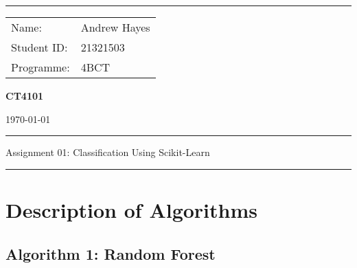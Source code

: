 \documentclass[a4paper]{article}
\begin{document}
\hrule \medskip
\begin{minipage}{0.295\textwidth} 
    \vfill
    \raggedright
    \footnotesize 
    \begin{tabular}{@{}l l} %
        Name: & Andrew Hayes \\
        Student ID: & 21321503 \\
        Programme: & 4BCT \\
    \end{tabular}
    \vfill
\end{minipage}
\begin{minipage}{0.4\textwidth} 
    \centering 
    \Large 
    \vfill
    \textbf{CT4101}
    \vfill
\end{minipage}
\begin{minipage}{0.295\textwidth} 
    \raggedleft
    \vfill
    \today
    \vfill
\end{minipage}
\smallskip
\hrule 
\begin{center}
    \normalsize
    Assignment 01: Classification Using Scikit-Learn
\end{center}
\hrule

\section{Description of Algorithms}
\subsection{Algorithm 1: Random Forest}
\end{document}
